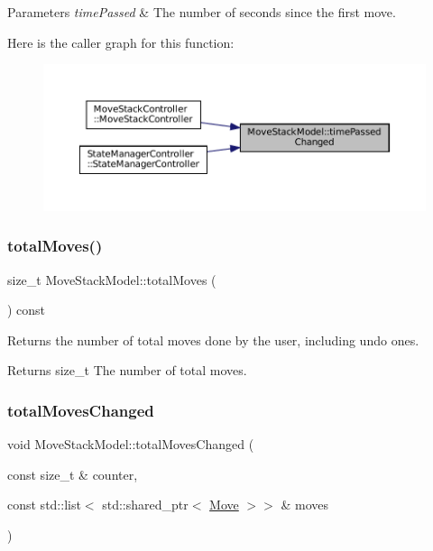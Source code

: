 \begin{DoxyParams}{Parameters}
{\em time\+Passed} & The number of seconds since the first move. \\
\hline
\end{DoxyParams}
Here is the caller graph for this function\+:
\nopagebreak
\begin{figure}[H]
\begin{center}
\leavevmode
\includegraphics[width=350pt]{class_move_stack_model_aa7d3186093032e523b2a7bbefa74f8fb_icgraph}
\end{center}
\end{figure}
\mbox{\label{class_move_stack_model_a59f08def53913e4f33df7fe30a16dc75}} 
\subsubsection{\texorpdfstring{totalMoves()}{totalMoves()}}
{\footnotesize\ttfamily size\+\_\+t Move\+Stack\+Model\+::total\+Moves (\begin{DoxyParamCaption}{ }\end{DoxyParamCaption}) const\hspace{0.3cm}{\ttfamily [inline]}}



Returns the number of total moves done by the user, including {\ttfamily undo} ones. 

\begin{DoxyReturn}{Returns}
size\+\_\+t The number of total moves. 
\end{DoxyReturn}
\mbox{\label{class_move_stack_model_a8b596d9619735fc7d066a3d0e1b8cc55}} 
\subsubsection{\texorpdfstring{totalMovesChanged}{totalMovesChanged}}
{\footnotesize\ttfamily void Move\+Stack\+Model\+::total\+Moves\+Changed (\begin{DoxyParamCaption}\item[{const size\+\_\+t \&}]{counter,  }\item[{const std\+::list$<$ std\+::shared\+\_\+ptr$<$ \mbox{\hyperlink{struct_move}{Move}} $>$$>$ \&}]{moves }\end{DoxyParamCaption})\hspace{0.3cm}{\ttfamily [signal]}}



